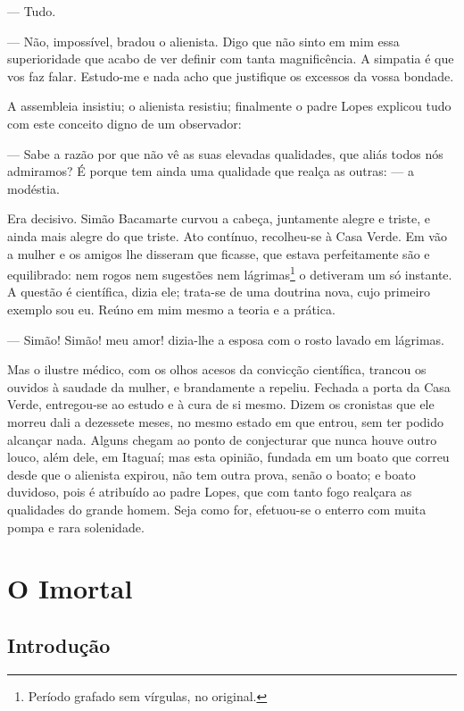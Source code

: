 --- Tudo.

--- Não, impossível, bradou o alienista. Digo que não sinto em mim essa
superioridade que acabo de ver definir com tanta magnificência. A
simpatia é que vos faz falar. Estudo-me e nada acho que justifique os
excessos da vossa bondade.

A assembleia insistiu; o alienista resistiu; finalmente o padre Lopes
explicou tudo com este conceito digno de um observador:

--- Sabe a razão por que não vê as suas elevadas qualidades, que aliás
todos nós admiramos? É porque tem ainda uma qualidade que realça as
outras: --- a modéstia.

Era decisivo. Simão Bacamarte curvou a cabeça, juntamente alegre e
triste, e ainda mais alegre do que triste. Ato contínuo, recolheu-se à
Casa Verde. Em vão a mulher e os amigos lhe disseram que ficasse, que
estava perfeitamente são e equilibrado: nem rogos nem sugestões nem
lágrimas\footnote{Período grafado sem vírgulas, no original.} o
detiveram um só instante. A questão é científica, dizia ele; trata-se de
uma doutrina nova, cujo primeiro exemplo sou eu. Reúno em mim mesmo a
teoria e a prática.

--- Simão! Simão! meu amor! dizia-lhe a esposa com o rosto lavado em
lágrimas.

Mas o ilustre médico, com os olhos acesos da convicção científica,
trancou os ouvidos à saudade da mulher, e brandamente a repeliu. Fechada
a porta da Casa Verde, entregou-se ao estudo e à cura de si mesmo. Dizem
os cronistas que ele morreu dali a dezessete meses, no mesmo estado em
que entrou, sem ter podido alcançar nada. Alguns chegam ao ponto de
conjecturar que nunca houve outro louco, além dele, em Itaguaí; mas esta
opinião, fundada em um boato que correu desde que o alienista expirou,
não tem outra prova, senão o boato; e boato duvidoso, pois é atribuído
ao padre Lopes, que com tanto fogo realçara as qualidades do grande
homem. Seja como for, efetuou-se o enterro com muita pompa e rara
solenidade.

\part{O Imortal}

\chapter[Introdução, \emph{por João Adolfo Hansen}]{Introdução}

